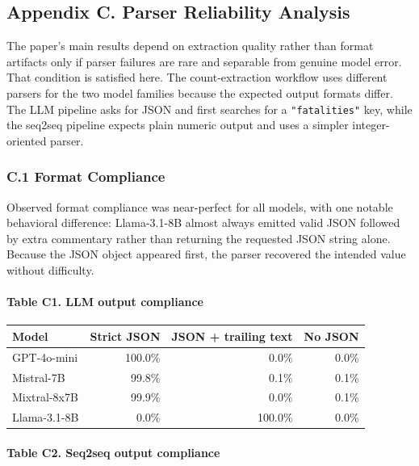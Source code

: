 \documentclass[
  11pt,
]{article}
\begin{document}
\subsection{Appendix C. Parser Reliability
Analysis}\label{appendix-c.-parser-reliability-analysis}

The paper's main results depend on extraction quality rather than format
artifacts only if parser failures are rare and separable from genuine
model error. That condition is satisfied here. The count-extraction
workflow uses different parsers for the two model families because the
expected output formats differ. The LLM pipeline asks for JSON and first
searches for a \texttt{"fatalities"} key, while the seq2seq pipeline
expects plain numeric output and uses a simpler integer-oriented parser.

\subsubsection{C.1 Format Compliance}\label{c.1-format-compliance}

Observed format compliance was near-perfect for all models, with one
notable behavioral difference: Llama-3.1-8B almost always emitted valid
JSON followed by extra commentary rather than returning the requested
JSON string alone. Because the JSON object appeared first, the parser
recovered the intended value without difficulty.

\paragraph{Table C1. LLM output
compliance}\label{table-c1.-llm-output-compliance}

\begin{longtable}[]{@{}lrrr@{}}
\toprule\noalign{}
Model & Strict JSON & JSON + trailing text & No JSON \\
\midrule\noalign{}
\endhead
\bottomrule\noalign{}
\endlastfoot
GPT-4o-mini & 100.0\% & 0.0\% & 0.0\% \\
Mistral-7B & 99.8\% & 0.1\% & 0.1\% \\
Mixtral-8x7B & 99.9\% & 0.0\% & 0.1\% \\
Llama-3.1-8B & 0.0\% & 100.0\% & 0.0\% \\
\end{longtable}

\paragraph{Table C2. Seq2seq output
compliance}\label{table-c2.-seq2seq-output-compliance}
\end{document}
